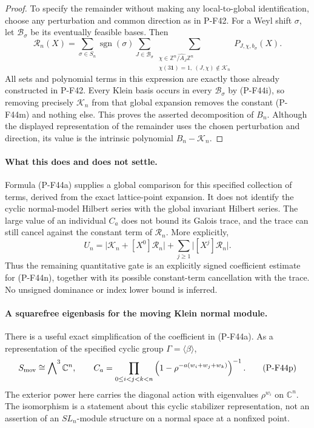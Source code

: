 \begin{proof}
To specify the remainder without making any local-to-global
identification, choose any perturbation and common direction
as in P-F42. For a Weyl shift $\sigma$, let
$\mathscr B_\sigma$ be its eventually feasible bases.
Then
\[
 \mathcal R_n(X)=
 \sum_{\sigma\in S_n}\operatorname{sgn}(\sigma)
 \sum_{J\in\mathscr B_\sigma}
 \sum_{\substack{\chi\in\widehat{\mathbb Z^n/A_J\mathbb Z^n}\\
                 \chi(3\mathbf1)=1,\ (J,\chi)\notin\mathscr K_n}}
              P_{J,\chi,b_\sigma}(X).
 \tag{P-F44n}
\]
All sets and polynomial terms in this expression are
exactly those already constructed in P-F42.
Every Klein basis occurs in every $\mathscr B_\sigma$
by (P-F44i), so removing precisely $\mathscr K_n$
from that global expansion removes the constant
(P-F44m) and nothing else.
This proves the asserted decomposition of $B_n$.
Although the displayed representation of the remainder
uses the chosen perturbation and direction, its value
is the intrinsic polynomial $B_n-\mathcal K_n$.
\end{proof}

\paragraph{What this does and does not settle.}
Formula (P-F44a) supplies a global comparison for this
specified collection of terms, derived from the exact
lattice-point expansion. It does not identify the cyclic
normal-model Hilbert series with the global invariant
Hilbert series.
The large value of an individual $C_a$ does not bound
its Galois trace, and the trace can still cancel against
the constant term of $\mathcal R_n$.
More explicitly,
\[
 U_n=
   \bigl|\mathcal K_n+[X^0]\mathcal R_n\bigr|
       +\sum_{j\ge1}\bigl|[X^j]\mathcal R_n\bigr|.
 \tag{P-F44o}
\]
Thus the remaining quantitative gate is an explicitly
signed coefficient estimate for (P-F44n), together with
its possible constant-term cancellation with the trace.
No unsigned dominance or index lower bound is inferred.

\paragraph{A squarefree eigenbasis for the moving Klein normal module.}
There is a useful exact simplification of the coefficient in
(P-F44a). As a representation of the specified cyclic group
$\Gamma=\langle\beta\rangle$,
\[
                  S_{\rm mov}\cong\bigwedge\nolimits^3\mathbb C^n,
 \qquad
 C_a=
 \prod_{0\le i<j<k<n}
       \left(1-\rho^{-a(w_i+w_j+w_k)}\right)^{-1}.
 \tag{P-F44p}
\]
The exterior power here carries the diagonal action with
eigenvalues $\rho^{w_i}$ on $\mathbb C^n$.
The isomorphism is a statement about this cyclic stabilizer
representation, not an assertion of an $SL_n$-module structure
on a normal space at a nonfixed point.

